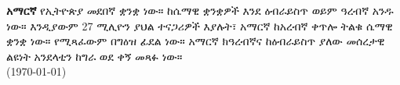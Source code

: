 \documentclass[a4paper]{article}
\begin{document}
%

\begin{amharic}
\textbf{አማርኛ} የኢትዮጵያ መደበኛ ቋንቋ ነው። ከሴማዊ ቋንቋዎች እንደ ዕብራይስጥ ወይም ዓረብኛ አንዱ ነው። እንዲያውም 27 ሚሊዮን ያህል ተናጋሪዎች እያሉት፣ አማርኛ ከአረብኛ ቀጥሎ ትልቁ ሴማዊ ቋንቋ ነው። የሚጻፈውም በግዕዝ ፊደል ነው። አማርኛ ክዓረብኛና ከዕብራይስጥ ያለው መሰረታዊ ልዩነት አንደላቲን ከግራ ወደ ቀኝ መጻፉ ነው። \\
(\today)
\end{amharic}
\end{document}
